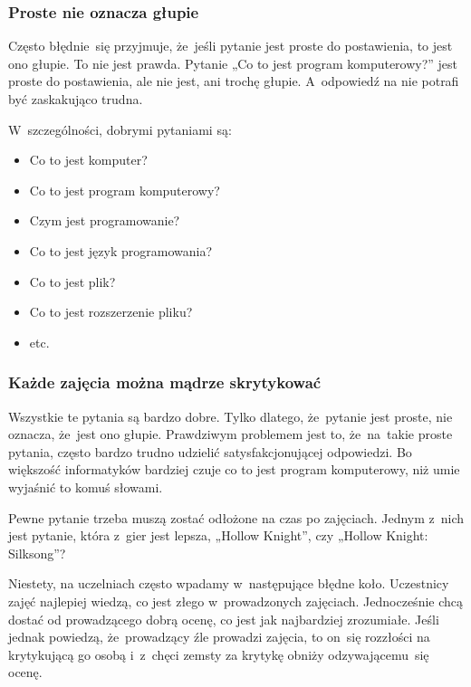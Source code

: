 \documentclass[10pt,t]{beamer}
\begin{document}
\begin{frame}
  \frametitle{Proste nie oznacza głupie}


  Często błędnie~się przyjmuje, że~jeśli pytanie jest proste do postawienia,
  to jest ono głupie. To nie jest prawda. Pytanie „Co to jest program
  komputerowy?” jest proste do postawienia, ale nie jest, ani trochę głupie.
  A~odpowiedź na nie potrafi być zaskakująco trudna.

  W~szczególności, dobrymi pytaniami są:
  \begin{itemize}

  \item Co to jest komputer?

  \item Co to jest program komputerowy?

  \item Czym jest programowanie?

  \item Co to jest język programowania?

  \item Co to jest plik?

  \item Co to jest rozszerzenie pliku?

  \item etc.

  \end{itemize}

\end{frame}





\begin{frame}
  \frametitle{Każde zajęcia można mądrze skrytykować}


  Wszystkie te pytania są bardzo dobre. Tylko dlatego, że~pytanie jest
  proste, nie oznacza, że~jest ono głupie. Prawdziwym problemem jest to,
  że~na~takie proste pytania, często bardzo trudno udzielić
  satysfakcjonującej odpowiedzi. Bo większość informatyków bardziej czuje
  co to jest program komputerowy, niż umie wyjaśnić to komuś słowami.

  Pewne pytanie trzeba muszą zostać odłożone na czas po zajęciach.
  Jednym z~nich jest pytanie, która z~gier jest lepsza, „Hollow Knight”,
  czy „Hollow Knight: Silksong”?

  Niestety, na uczelniach często wpadamy w~następujące błędne koło.
  Uczestnicy zajęć najlepiej wiedzą, co jest złego w~prowadzonych zajęciach.
  Jednocześnie chcą dostać od prowadzącego dobrą ocenę, co jest jak
  najbardziej zrozumiałe. Jeśli jednak powiedzą, że~prowadzący źle prowadzi
  zajęcia, to on~się rozzłości na krytykującą go osobą i~z~chęci zemsty
  za krytykę obniży odzywającemu~się ocenę.

\end{frame}
\end{document}
